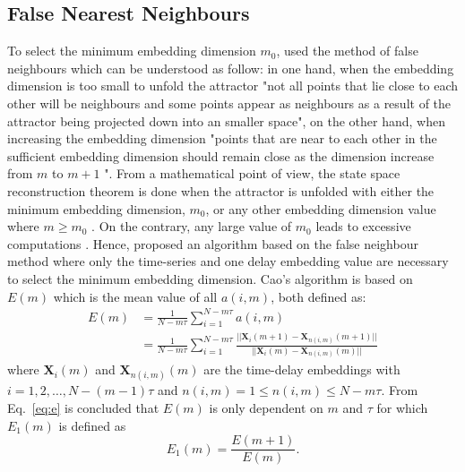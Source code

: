 \subsection{False Nearest Neighbours}
To select the minimum embedding dimension $m_0$, \cite{kennel1992}
used the method of false neighbours which can be understood as follow:
in one hand, when the embedding dimension is too small to unfold the attractor
"not all points that lie close to each other will be neighbours and some points
appear as neighbours as a result of the attractor being projected down into an
smaller space", on the other hand, when increasing the embedding dimension
 "points that are near to each other in the sufficient
embedding dimension should remain close as the dimension increase from $m$ to $m+1$
\cite{krakovska2015}".
From a mathematical point of view, 
the state space reconstruction theorem is done when the attractor is unfolded with either 
the minimum embedding dimension, $m_0$, or any other embedding dimension value where $m \ge m_0$ \cite{kennel1992}.
On the contrary, any large value of $m_0$ leads to excessive computations \cite{bradley2015}.
Hence, \cite{Cao1997} proposed an algorithm based on the
false neighbour method where only the time-series and one delay embedding value 
are necessary to select the minimum embedding dimension.
Cao's algorithm is based on $E(m)$  which is the mean value of all $a(i,m)$,
both defined as: 
\begin{equation}\label{eq:e}
  \begin{aligned}
E(m) &= \frac{1}{N-m\tau} \sum_{i=1}^{N-m\tau} a(i,m) \\
    &=
       \frac{1}{N-m\tau} \sum_{i=1}^{N-m\tau}
       \frac{ || \boldsymbol{X}_i(m+1) - \boldsymbol{X}_{n(i,m)}(m+1) || }
            { || \boldsymbol{X}_i(m) - \boldsymbol{X}_{n(i,m)}(m) ||  }
  \end{aligned}
\end{equation}
where $\boldsymbol{X}_i(m)$ and $\boldsymbol{X}_{n(i,m)}(m)$ are the time-delay
embeddings with $i=1,2,\dots,N-(m-1)\tau$ and $ n(i,m)= 1 \le n(i,m) \le N-m\tau$.
From Eq.~\ref{eq:e} is concluded that $E(m)$ is only dependent on $m$ and $\tau$
for which $E_1(m)$ is defined as
\begin{equation}\label{eq:e1}
E_1(m) = \frac{ E(m+1) } { E(m)}.
\end{equation}
